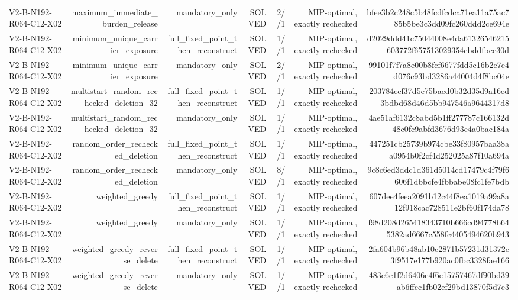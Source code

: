 {\begin{longtable}{lrrrrrr}
V2-B-N192-R064-C12-X02 & maximum\_immediate\_burden\_release & mandatory\_only & SOLVED & 2//1 & MIP-optimal, exactly rechecked & bfee3b2c248c5b48fcdfcdca71ea11a75ac785b5be3c3dd09fc260ddd2ce694e \\
V2-B-N192-R064-C12-X02 & minimum\_unique\_carrier\_exposure & full\_fixed\_point\_then\_reconstruct & SOLVED & 1//1 & MIP-optimal, exactly rechecked & d2029ddd41c75044008e4da61326546215603772f657513029354cbddfbce30d \\
V2-B-N192-R064-C12-X02 & minimum\_unique\_carrier\_exposure & mandatory\_only & SOLVED & 2//1 & MIP-optimal, exactly rechecked & 99101f7f7a8e00b8fcf6677fdd5c16b2e7e4d076c93bd3286a44004d4f8bc04e \\
V2-B-N192-R064-C12-X02 & multistart\_random\_rechecked\_deletion\_32 & full\_fixed\_point\_then\_reconstruct & SOLVED & 1//1 & MIP-optimal, exactly rechecked & 203784ecf37d5e75baed0b32d35d9a16ed3bdbd68d46d5bb947546a9644317d8 \\
V2-B-N192-R064-C12-X02 & multistart\_random\_rechecked\_deletion\_32 & mandatory\_only & SOLVED & 1//1 & MIP-optimal, exactly rechecked & 4ae51af6132c8abd5b1ff277787c166132d48c0fc9abfd3676d93e4a0bac184a \\
V2-B-N192-R064-C12-X02 & random\_order\_rechecked\_deletion & full\_fixed\_point\_then\_reconstruct & SOLVED & 1//1 & MIP-optimal, exactly rechecked & 447251cb25739b974cbe33f80957baa38aa0954b0f2cf4d252025a87f10a694a \\
V2-B-N192-R064-C12-X02 & random\_order\_rechecked\_deletion & mandatory\_only & SOLVED & 8//1 & MIP-optimal, exactly rechecked & 9c8c6ed3ddc1d361d5014cd17479c4f79f6606f1dbbcfe4fbbabe08fc1fe7bdb \\
V2-B-N192-R064-C12-X02 & weighted\_greedy & full\_fixed\_point\_then\_reconstruct & SOLVED & 1//1 & MIP-optimal, exactly rechecked & 607dee4feea2091b12c44f8ea1019a99a8a12f918cac728511e2bf60f174da78 \\
V2-B-N192-R064-C12-X02 & weighted\_greedy & mandatory\_only & SOLVED & 1//1 & MIP-optimal, exactly rechecked & f98d208d265418343710b666cd94778b645382ad6667c558fc4405494620b943 \\
V2-B-N192-R064-C12-X02 & weighted\_greedy\_reverse\_delete & full\_fixed\_point\_then\_reconstruct & SOLVED & 1//1 & MIP-optimal, exactly rechecked & 2fa604b96b48ab10c2871b57231d31372e3f9517e177b920ac0fbc3328fae166 \\
V2-B-N192-R064-C12-X02 & weighted\_greedy\_reverse\_delete & mandatory\_only & SOLVED & 1//1 & MIP-optimal, exactly rechecked & 483c6e1f2d6406e4f6e15757467df90bd39ab6ffcc1fb02ef29bd13870f5d7e3 \\

\end{longtable}}
